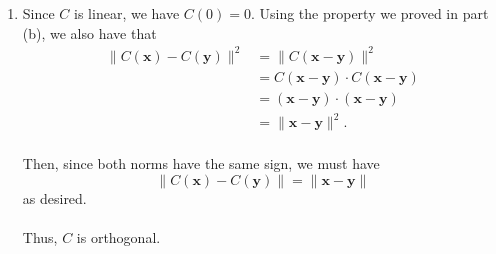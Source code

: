 \documentclass[12 pt, letterpaper]{hmcpset}
\begin{document}
\begin{solution}
\begin{enumerate}
\[\begin{split}
\begin{bmatrix}
						3
					\end{bmatrix} \\
								    & = 3 - 18 \\
								    & = -15.
				\end{split}
			\]
			and
			\[
				\begin{split}
					C(\mathbf{p}) \cdot C(\mathbf{q}) & = \frac{1}{9} \begin{bmatrix}
						2 \\
						19 \\
						-7
					\end{bmatrix} \cdot \begin{bmatrix}
						-5 \\
						-4 \\
						7
					\end{bmatrix} \\
									  & = \frac{-10 - 76 - 49}{9} \\
									  & = -\frac{135}{9} \\
									  & = - 15.
				\end{split}
			\]
			Thus, we have $C(\mathbf{p}) \cdot C(\mathbf{q}) = \mathbf{p} \cdot \mathbf{q}$.
		\item Since $C$ is linear, we have $C(0) = 0$. Using the property we proved in part (b), we also have that
			\[
				\begin{split}
					\lVert C(\mathbf{x}) - C(\mathbf{y}) \rVert^{2} & = \lVert C(\mathbf{x} - \mathbf{y}) \rVert^{2} \\
											& = C(\mathbf{x} - \mathbf{y}) \cdot C(\mathbf{x} - \mathbf{y}) \\
											& = (\mathbf{x} - \mathbf{y}) \cdot (\mathbf{x} - \mathbf{y}) \\
											& = \lVert \mathbf{x} - \mathbf{y} \rVert^{2}.
				\end{split}
			\] \\
			Then, since both norms have the same sign, we must have
			\[
				\lVert C(\mathbf{x}) - C(\mathbf{y}) \rVert = \lVert \mathbf{x} - \mathbf{y} \rVert
			\]
			as desired. \\\\
			Thus, $C$ is orthogonal.
	\end{enumerate}
\end{solution}

\pagebreak
\end{document}
